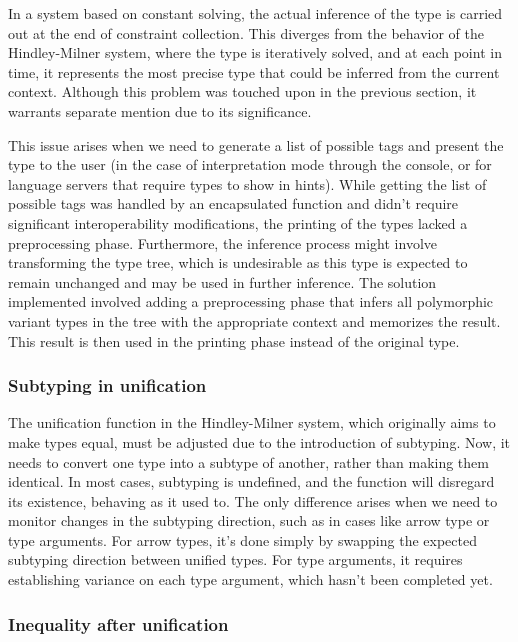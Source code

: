 \documentclass[a4paper,11pt,oneside]{article}
\theoremstyle{definition}
\begin{document}
In a system based on constant solving, the actual inference of the type is carried out at the end of constraint collection. This diverges from the behavior of the Hindley-Milner system, where the type is iteratively solved, and at each point in time, it represents the most precise type that could be inferred from the current context. Although this problem was touched upon in the previous section, it warrants separate mention due to its significance.

This issue arises when we need to generate a list of possible tags and present the type to the user (in the case of interpretation mode through the console, or for language servers that require types to show in hints). While getting the list of possible tags was handled by an encapsulated function and didn't require significant interoperability modifications, the printing of the types lacked a preprocessing phase. Furthermore, the inference process might involve transforming the type tree, which is undesirable as this type is expected to remain unchanged and may be used in further inference. The solution implemented involved adding a preprocessing phase that infers all polymorphic variant types in the tree with the appropriate context and memorizes the result. This result is then used in the printing phase instead of the original type.

\subsubsection{Subtyping in unification}

The unification function in the Hindley-Milner system, which originally aims to make types equal, must be adjusted due to the introduction of subtyping. Now, it needs to convert one type into a subtype of another, rather than making them identical. In most cases, subtyping is undefined, and the function will disregard its existence, behaving as it used to. The only difference arises when we need to monitor changes in the subtyping direction, such as in cases like arrow type or type arguments. For arrow types, it's done simply by swapping the expected subtyping direction between unified types. For type arguments, it requires establishing variance on each type argument, which hasn't been completed yet.

\subsubsection{Inequality after unification}
\end{document}
